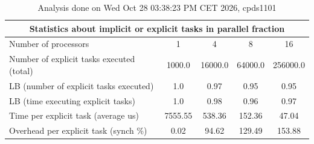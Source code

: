 \begin{table}[h]
\begin{center}
\begin{tabular}{|l|c|c|c|c|}
\hline
\multicolumn{5}{|c|}{Statistics about implicit or explicit tasks in parallel fraction} \\
\hline
\hline
Number of processors & 1 & 4 & 8 & 16 \\
\hline
\hline
Number of explicit tasks executed (total)        &          1000.0 &         16000.0 &         64000.0 &        256000.0 \\
\hline
LB (number of explicit tasks executed)           &             1.0 &            0.97 &            0.95 &            0.95 \\
\hline
LB (time executing explicit tasks)               &             1.0 &            0.98 &            0.96 &            0.97 \\
\hline
Time per explicit task (average us)                 &         7555.55 &          538.36 &          152.36 &           47.04 \\
\hline
Overhead per explicit task (synch \%)             &            0.02 &           94.62 &          129.49 &          153.88 \\
\hline
\end{tabular}
\end{center}
\caption{ Analysis done on Wed Oct 28 03:38:23 PM CET 2026, cpds1101}
\end{table}
